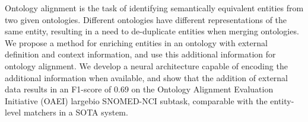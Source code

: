 Ontology alignment is the task of identifying semantically equivalent entities from two given ontologies. Different ontologies have different representations of the same entity, resulting in a need to de-duplicate entities when merging ontologies. We propose a method for enriching entities in an ontology with external definition and context information, and use this additional information for ontology alignment. We develop a neural architecture capable of encoding the additional information when available, and show that the addition of external data results in an F1-score of 0.69 on the Ontology Alignment Evaluation Initiative (OAEI) largebio SNOMED-NCI subtask, comparable with the entity-level matchers in a SOTA system.
